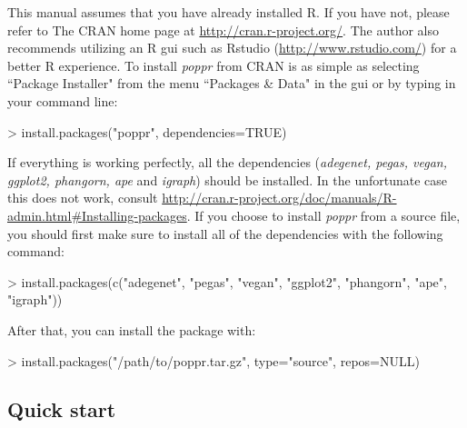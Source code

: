 \documentclass[letterpaper]{article}
\newcommand{\tab}{\hspace*{1em}}
\begin{document}
\tab\tab This manual assumes that you have already installed R. If you have not, please refer to The CRAN home page at \url{http://cran.r-project.org/}. The author also recommends utilizing an R gui such as Rstudio (\url{http://www.rstudio.com/}) for a better R experience. 
To install \textit{poppr} from CRAN is as simple as selecting ``Package Installer" from the menu ``Packages \& Data" in the gui or by typing in your command line:
\begin{Schunk}
\begin{Sinput}
> install.packages("poppr", dependencies=TRUE)
\end{Sinput}
\end{Schunk}
If everything is working perfectly, all the dependencies (\textit{adegenet, pegas, vegan, ggplot2, phangorn, ape} and \textit{igraph}) should be installed. In the unfortunate case this does not work, consult \url{http://cran.r-project.org/doc/manuals/R-admin.html#Installing-packages}.
If you choose to install \textit{poppr} from a source file, you should first make sure to install all of the dependencies with the following command:
\begin{Schunk}
\begin{Sinput}
> install.packages(c("adegenet", "pegas", "vegan", "ggplot2", "phangorn", "ape", "igraph"))
\end{Sinput}
\end{Schunk}
After that, you can install the package with:
\begin{Schunk}
\begin{Sinput}
> install.packages("/path/to/poppr.tar.gz", type="source", repos=NULL)
\end{Sinput}
\end{Schunk}
\subsection{Quick start}\label{intro:qstart}
\end{document}
